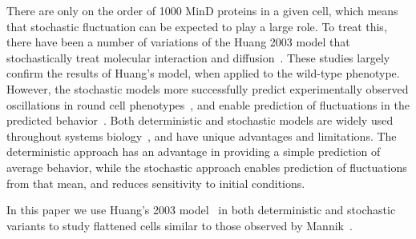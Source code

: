\documentclass[letterpaper,twocolumn,amsmath,amssymb,pre]{revtex4-1}
\newcommand{\red}[1]{{\bf \color{red} #1}}
\newcommand{\fixme}[1]{\red{[#1]}}
\begin{document}
There are only on the order of 1000 MinD proteins in a given cell,
which means that stochastic fluctuation can be expected to play a
large role.  To treat this, there have been a number of variations of
the Huang 2003 model that stochastically treat molecular interaction
and diffusion~\cite{fange2006noise, kerr2006division}.  These studies
largely confirm the results of Huang's model, when applied to the
wild-type phenotype.  However, the stochastic models more successfully
predict experimentally observed oscillations in round cell
phenotypes~\cite{fange2006noise, huang2004min}, and enable prediction
of fluctuations in the predicted
behavior~\cite{kruse2007experimentalist}.  Both deterministic and
stochastic models are widely used throughout systems
biology~\cite{lawson2013spatial, robb2014stochastic,
  oguz2014stochastic, fu2013deterministic, rudiger2014stochastic}, and
have unique advantages and limitations.  The deterministic approach
has an advantage in providing a simple prediction of average behavior,
while the stochastic approach enables prediction of fluctuations from
that mean, and reduces sensitivity to initial conditions.


In this paper we use Huang's 2003 model~\cite{huang2003dynamic} in
both deterministic and stochastic variants to study flattened cells
similar to those observed by Mannik~\cite{mannik2009bacterial}.
\end{document}
